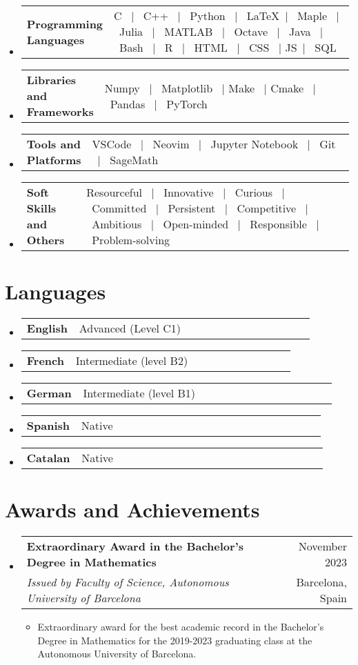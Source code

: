 \documentclass[a4paper,11pt]{article}
\makeatletter
\newcommand{\resumeSectionTypeOne}[2]{
  \item\begin{tabular*}{0.99\textwidth}[t]{
    p{0.18\linewidth}p{0.81\linewidth}
  }
  \textbf{#1} & #2
  \end{tabular*}\vspace{-2pt}
}
\newcommand{\resumeQuadHeading}[4]{
  \item
  \begin{tabular*}{0.96\textwidth}[t]{l@{\extracolsep{\fill}}r}
    \textbf{#1} & \small #2 \\
    \small#3 & \small #4 \\
  \end{tabular*}
}
\newcommand{\resumeHeadingListStart}{
  \begin{itemize}[leftmargin=0.15in, label={}]
}
\newcommand{\resumeHeadingListEnd}{\end{itemize}}
\makeatother
\begin{document}
\resumeHeadingListStart{}
\resumeSectionTypeOne{Programming Languages}{C \ $|$ \ C++ \ $|$ \ Python \ $|$ \ \LaTeX \ $|$ \ Maple \ $|$ \ Julia \ $|$ \ MATLAB \ $|$ \ Octave \ $|$ \ Java \ $|$ \ Bash \qquad\ $|$ \ R \ $|$ \ HTML \ $|$ \ CSS \ $|$ JS\ $|$ \ SQL}
\resumeHeadingListEnd{}

\resumeHeadingListStart{}
\resumeSectionTypeOne{Libraries and Frameworks}{Numpy \ $|$ \ Matplotlib \ $|$ Make \ $|$ Cmake \ $|$  \ Pandas \ $|$ \ PyTorch}
\resumeHeadingListEnd{}

\resumeHeadingListStart{}
\resumeSectionTypeOne{Tools and\hspace{0.5cm} Platforms}{VSCode \ $|$ \ Neovim  \ $|$ \ Jupyter Notebook \ $|$ \ Git \ $|$ \ SageMath}
\resumeHeadingListEnd{}

\resumeHeadingListStart{}
\resumeSectionTypeOne{Soft Skills and Others}{Resourceful \ $|$ \ Innovative \ $|$ \ Curious \ $|$ \ Committed \ $|$ \ Persistent \ $|$ \ Competitive \qquad\ $|$ \ Ambitious \ $|$ \ Open-minded \ $|$ \ Responsible \ $|$ \ Problem-solving}
\resumeHeadingListEnd{}

\section{Languages}
\resumeHeadingListStart{}
\resumeSectionTypeOne{English}{Advanced (Level C1)}
\resumeSectionTypeOne{French}{Intermediate (level B2)}
\resumeSectionTypeOne{German}{Intermediate (level B1)}
\resumeSectionTypeOne{Spanish}{Native}
\resumeSectionTypeOne{Catalan}{Native}
\resumeHeadingListEnd{}

\section{Awards and Achievements}
\resumeHeadingListStart{}
\resumeQuadHeading{Extraordinary Award in the Bachelor's Degree in Mathematics}{November 2023}{\textit{Issued by Faculty of Science, Autonomous University of Barcelona}}{Barcelona, Spain}
\begin{itemize}[leftmargin=3em, itemsep=0.1em, topsep=2pt]
  \item \small Extraordinary award for the best academic record in the Bachelor's Degree in Mathematics for the 2019-2023 graduating class at the Autonomous University of Barcelona.
\end{itemize}
\resumeHeadingListEnd{}
\end{document}
